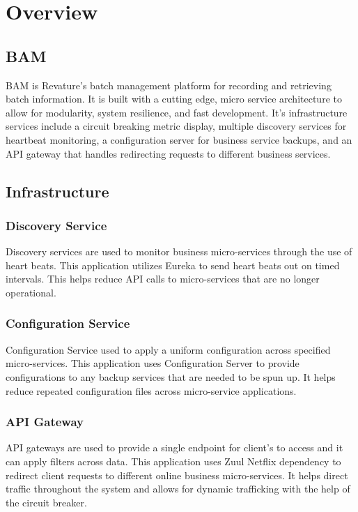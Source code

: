 \chapter{Overview}
\section{BAM}
BAM is Revature's batch management platform for recording and retrieving batch information. It is built with a cutting edge, micro service architecture to allow for modularity, system resilience, and fast development. It’s infrastructure services include a circuit breaking metric display, multiple discovery services for heartbeat monitoring, a configuration server for business service backups, and an API gateway that handles redirecting requests to different business services.

\section{Infrastructure}
\subsection{Discovery Service}
Discovery services are used to monitor business micro-services through the use of heart beats. This application utilizes Eureka to send heart beats out on timed intervals. This helps reduce API calls to micro-services that are no longer operational.

\subsection{Configuration Service}
Configuration Service used to apply a uniform configuration across specified micro-services. This application uses Configuration Server to provide configurations to any backup services that are needed to be spun up. It helps reduce repeated configuration files across micro-service applications.

\subsection{API Gateway}
API gateways are used to provide a single endpoint for client’s to access and it can apply filters across data. This application uses Zuul Netflix dependency to redirect client requests to different online business micro-services. It helps direct traffic throughout the system and allows for dynamic trafficking with the help of the circuit breaker.

